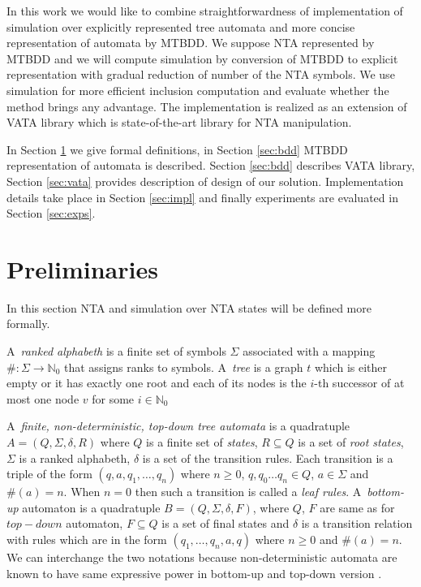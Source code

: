 \documentclass[a4paper, 12pt]{article}
\begin{document}
In this work we would like to combine straightforwardness of implementation of simulation over explicitly
represented tree automata and more concise representation of automata by MTBDD.
We suppose NTA represented by MTBDD and we will compute simulation by conversion of MTBDD
to explicit representation with gradual reduction of number of the NTA symbols.
We use simulation for more efficient inclusion computation and evaluate whether the method brings any advantage.
The implementation is realized as an extension of VATA library which is state-of-the-art library for NTA manipulation.

In Section \ref{sec:analysis} we give formal definitions, in Section \ref{sec:bdd} MTBDD representation of automata is described.
Section \ref{sec:bdd} describes VATA library, Section \ref{sec:vata} provides description of design of our solution.
Implementation details take place in Section \ref{sec:impl} and finally experiments are evaluated in Section \ref{sec:exps}.

\section{Preliminaries}
\label{sec:analysis}
In this section NTA and simulation over NTA states will be defined more formally.

A~\emph{ranked alphabeth} is a finite set of symbols $\Sigma$ associated with a mapping $\#: \Sigma \rightarrow \mathbb{N}_0$
that assigns ranks to symbols. A~\emph{tree} is a graph $t$ which is either empty or it has exactly one root and each of its
nodes is the $i$-th successor of at most one node $v$ for some $i \in \mathbb{N}_0$

A~\emph{finite, non-deterministic, top-down tree automata} is a quadratuple $A=(Q, \Sigma, \delta, R)$ where
$Q$ is a finite set of \emph{states}, $R\subseteq Q$ is a set of \emph{root states}, $\Sigma$ is a ranked alphabeth,
$\delta$ is a set of the transition rules.
Each transition is a triple of the form $(q,a,q_1, \ldots, q_n)$ where $n \geq 0$, $q, q_0 \ldots q_n \in Q$, $a \in \Sigma$ and $\#(a) = n$.
When $n = 0$ then such a transition is called a \emph{leaf rules}.
A~\emph{bottom-up} automaton is a quadratuple $B=(Q, \Sigma, \delta, F)$, where $Q$, $F$ are same as for $top-down$ automaton, $F\subseteq Q$
is a set of final states and $\delta$ is a transition relation with rules which are in the form $(q_1,\ldots, q_n,a,q)$ where $n \geq 0$ and $\#(a) = n$.
We can interchange the two notations because non-deterministic automata are known to have same expressive power in bottom-up and top-down version \cite{tata}.
\end{document}
